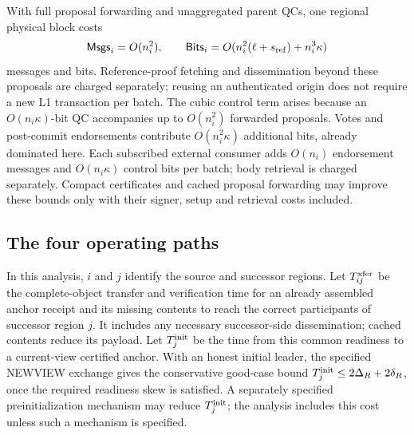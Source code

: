\documentclass[11pt,a4paper,onecolumn]{article}
\begin{document}
With full proposal forwarding and unaggregated parent QCs, one regional
physical block costs
\[
 \mathsf{Msgs}_i=O(n_i^2),\qquad
 \mathsf{Bits}_i=O(n_i^2(\ell+s_{\rm ref})+n_i^3\kappa)
\]
messages and bits. Reference-proof fetching and dissemination beyond
these proposals are charged separately; reusing an authenticated origin
does not require a new L1 transaction per batch. The cubic control term arises because an
$O(n_i\kappa)$-bit QC accompanies up to $O(n_i^2)$ forwarded proposals.
Votes and post-commit endorsements contribute $O(n_i^2\kappa)$ additional
bits, already dominated here. Each subscribed external consumer adds
$O(n_i)$ endorsement messages and $O(n_i\kappa)$ control bits per batch;
body retrieval is charged separately. Compact certificates and cached
proposal forwarding may improve these bounds only with their signer,
setup and retrieval costs included.

\subsection{The four operating paths}
In this analysis, $i$ and $j$ identify the source and successor regions.
Let $T_{ij}^{\rm xfer}$ be the complete-object transfer and verification time for an
already assembled anchor receipt and its missing contents to reach the
correct participants of successor region $j$. It includes any necessary
successor-side dissemination; cached contents reduce its payload. Let
$T_j^{\rm init}$ be the time from this common readiness to a current-view certified
anchor. With an honest initial leader, the specified NEWVIEW exchange gives the
conservative good-case bound $T_j^{\rm init}\leq2\Delta_R+2\delta_R$, once the required readiness
skew is satisfied. A separately specified preinitialization mechanism may
reduce $T_j^{\rm init}$; the analysis includes this cost unless such a
mechanism is specified.
\end{document}
